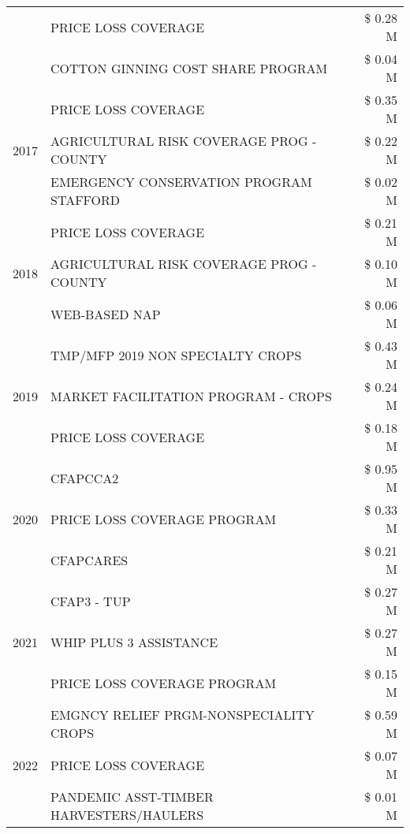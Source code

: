\begin{tabular}{llr}
 & PRICE LOSS COVERAGE & \$ 0.28 M \\
 & COTTON GINNING COST SHARE PROGRAM & \$ 0.04 M \\
\cline{1-3}
\multirow[t]{3}{*}{2017} & PRICE LOSS COVERAGE & \$ 0.35 M \\
 & AGRICULTURAL RISK COVERAGE PROG - COUNTY & \$ 0.22 M \\
 & EMERGENCY CONSERVATION PROGRAM STAFFORD & \$ 0.02 M \\
\cline{1-3}
\multirow[t]{3}{*}{2018} & PRICE LOSS COVERAGE & \$ 0.21 M \\
 & AGRICULTURAL RISK COVERAGE PROG - COUNTY & \$ 0.10 M \\
 & WEB-BASED NAP & \$ 0.06 M \\
\cline{1-3}
\multirow[t]{3}{*}{2019} & TMP/MFP 2019 NON SPECIALTY CROPS & \$ 0.43 M \\
 & MARKET FACILITATION PROGRAM - CROPS & \$ 0.24 M \\
 & PRICE LOSS COVERAGE & \$ 0.18 M \\
\cline{1-3}
\multirow[t]{3}{*}{2020} & CFAPCCA2 & \$ 0.95 M \\
 & PRICE LOSS COVERAGE PROGRAM & \$ 0.33 M \\
 & CFAPCARES & \$ 0.21 M \\
\cline{1-3}
\multirow[t]{3}{*}{2021} & CFAP3 - TUP & \$ 0.27 M \\
 & WHIP PLUS 3 ASSISTANCE & \$ 0.27 M \\
 & PRICE LOSS COVERAGE PROGRAM & \$ 0.15 M \\
\cline{1-3}
\multirow[t]{3}{*}{2022} & EMGNCY RELIEF PRGM-NONSPECIALITY CROPS & \$ 0.59 M \\
 & PRICE LOSS COVERAGE & \$ 0.07 M \\
 & PANDEMIC ASST-TIMBER HARVESTERS/HAULERS & \$ 0.01 M \\
\cline{1-3}
\bottomrule
\end{tabular}
